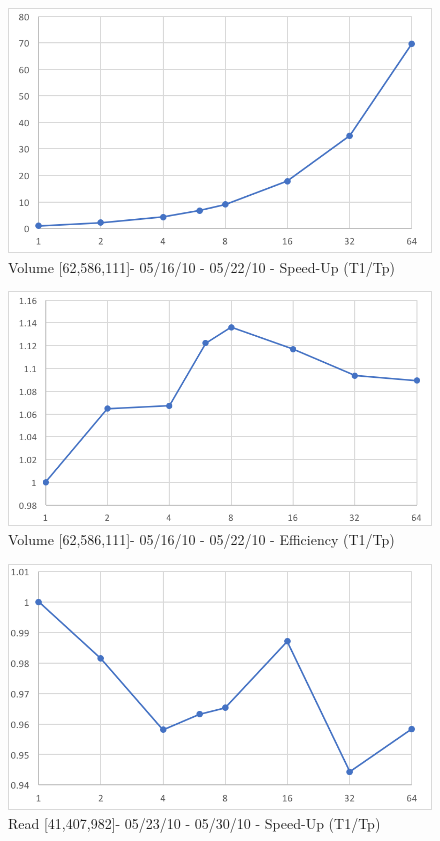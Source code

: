 \documentclass[12pt]{article} %
\begin{document}
\begin{figure}[htb]
\caption{Volume [62,586,111]- 05/16/10 - 05/22/10 - Speed-Up (T1/Tp)}\label{fig:benchmark01}
\centering
\includegraphics[width=15cm,keepaspectratio]{imgs/img11.png}
\end{figure} 

\begin{figure}[htb]
\caption{Volume [62,586,111]- 05/16/10 - 05/22/10 - Efficiency (T1/Tp)}\label{fig:benchmark01}
\centering
\includegraphics[width=15cm,keepaspectratio]{imgs/img12.png}
\end{figure} 


\begin{figure}[htb]
\caption{Read [41,407,982]- 05/23/10 - 05/30/10 - Speed-Up (T1/Tp)}\label{fig:benchmark01}
\centering
\includegraphics[width=15cm,keepaspectratio]{imgs/img13.png}
\end{figure} 
\end{document}
